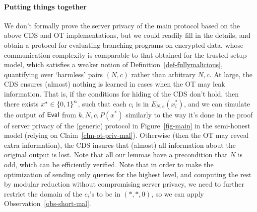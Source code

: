 \documentclass[11pt]{article}
\newcommand{\eval}{{\sf Eval}}
\newcommand{\encdj}{{E}_{N,e}}
\newcommand\ot{\mbox{OT}\xspace}
\newcommand{\mathify}[1]{\ifmmode{#1}\else\mbox{$#1$}\fi}
\newcommand{\set}[2][]{\mathify{{\left\{#2\right\}}^{#1}}}
\newcommand{\bools}[1][]{\set[#1]{0,1}}
\begin{document}
\paragraph{Putting things together}
We don't formally prove the server privacy of the main protocol based on the above CDS and \ot
implementations, but we could readily fill in the details, and obtain a protocol
for evaluating branching programs on encrypted data, whose communication complexity is comparable
to that obtained for the trusted setup model, which satisfies a weaker notion of Definition~\ref{def-fullymalicious}, quantifying over `harmless' pairs $(N,c)$ rather than arbitrary $N,c$. At large, the CDS ensures (almost) nothing is learned in cases when the \ot may leak information.
That is, if the conditions for hiding of the CDS don't hold,
then there exists $x^*\in\bools[n]$, such that each $c_i$ is in $\encdj(x^*_i)$, and we can simulate
the output of $\eval$ from $k,N,c,P(x^*)$ similarly to the way it's done in the proof of server privacy of
the (generic) protocol in Figure~\ref{fig-main} in the semi-honest model
(relying on Claim~\ref{clm-ot-priv-mal}). Otherwise (then the \ot may reveal extra information), the CDS insures that (almost) all information about the original output is lost.
Note that all our lemmas have a precondition that $N$ is odd, which can be efficiently verified.
Note that in order to make the optimization of sending only queries for the highest level, and computing the rest by modular reduction without compromising server privacy, we need to further restrict the domain of the $c_i$'s to be in $(*,*,0)$, so we can apply Observation~\ref{obs-short-mal}.
\end{document}
